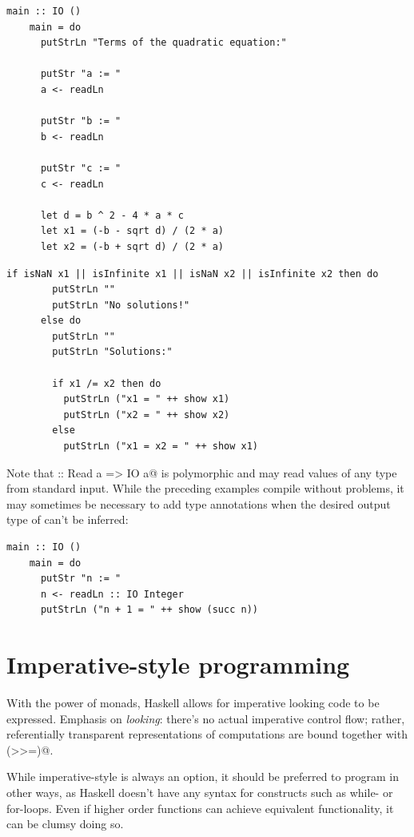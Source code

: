 \documentclass[UdineBachThesis,american,11pt]{PhdThesis}
\begin{document}
  \begin{lstlisting}[gobble=4,basicstyle=\ttfamily\small]
    main :: IO ()
    main = do
      putStrLn "Terms of the quadratic equation:"

      putStr "a := "
      a <- readLn

      putStr "b := "
      b <- readLn

      putStr "c := "
      c <- readLn

      let d = b ^ 2 - 4 * a * c
      let x1 = (-b - sqrt d) / (2 * a)
      let x2 = (-b + sqrt d) / (2 * a)
  \end{lstlisting}

  \newpage

  \begin{lstlisting}[gobble=4,basicstyle=\ttfamily\small]
      if isNaN x1 || isInfinite x1 || isNaN x2 || isInfinite x2 then do
        putStrLn ""
        putStrLn "No solutions!"
      else do
        putStrLn ""
        putStrLn "Solutions:"

        if x1 /= x2 then do
          putStrLn ("x1 = " ++ show x1)
          putStrLn ("x2 = " ++ show x2)
        else
          putStrLn ("x1 = x2 = " ++ show x1)
  \end{lstlisting}

  Note that \lstinline@readLn :: Read a => IO a@ is polymorphic and may read
  values of any type from standard input. While the preceding examples compile
  without problems, it may sometimes be necessary to add type annotations when
  the desired output type of \lstinline@readLn@ can't be inferred:

  \begin{lstlisting}[gobble=4,basicstyle=\ttfamily\small]
    main :: IO ()
    main = do
      putStr "n := "
      n <- readLn :: IO Integer
      putStrLn ("n + 1 = " ++ show (succ n))
  \end{lstlisting}

  \section{Imperative-style programming}

  With the power of monads, Haskell allows for imperative looking code to be
  expressed. Emphasis on \emph{looking}: there's no actual imperative control
  flow; rather, referentially transparent representations of computations are
  bound together with \lstinline@(>>=)@.

  While imperative-style is always an option, it should be preferred to program
  in other ways, as Haskell doesn't have any syntax for constructs such as
  while- or for-loops. Even if higher order functions can achieve equivalent
  functionality, it can be clumsy doing so.
\end{document}
